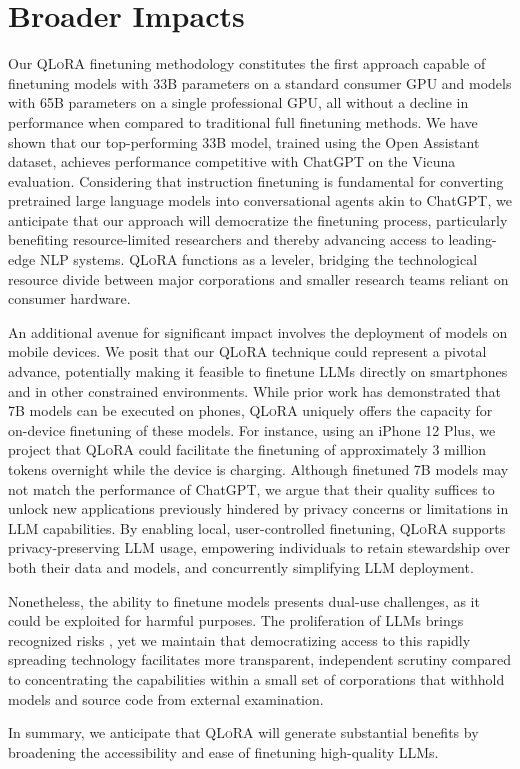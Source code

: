 \section{Broader Impacts}

Our \textsc{QLoRA} finetuning methodology constitutes the first approach capable of finetuning models with 33B parameters on a standard consumer GPU and models with 65B parameters on a single professional GPU, all without a decline in performance when compared to traditional full finetuning methods. We have shown that our top-performing 33B model, trained using the Open Assistant dataset, achieves performance competitive with ChatGPT on the Vicuna evaluation. Considering that instruction finetuning is fundamental for converting pretrained large language models into conversational agents akin to ChatGPT, we anticipate that our approach will democratize the finetuning process, particularly benefiting resource-limited researchers and thereby advancing access to leading-edge NLP systems. \textsc{QLoRA} functions as a leveler, bridging the technological resource divide between major corporations and smaller research teams reliant on consumer hardware.

An additional avenue for significant impact involves the deployment of models on mobile devices. We posit that our \textsc{QLoRA} technique could represent a pivotal advance, potentially making it feasible to finetune LLMs directly on smartphones and in other constrained environments. While prior work has demonstrated that 7B models can be executed on phones, \textsc{QLoRA} uniquely offers the capacity for on-device finetuning of these models. For instance, using an iPhone 12 Plus, we project that \textsc{QLoRA} could facilitate the finetuning of approximately 3 million tokens overnight while the device is charging. Although finetuned 7B models may not match the performance of ChatGPT, we argue that their quality suffices to unlock new applications previously hindered by privacy concerns or limitations in LLM capabilities. By enabling local, user-controlled finetuning, \textsc{QLoRA} supports privacy-preserving LLM usage, empowering individuals to retain stewardship over both their data and models, and concurrently simplifying LLM deployment.

Nonetheless, the ability to finetune models presents dual-use challenges, as it could be exploited for harmful purposes. The proliferation of LLMs brings recognized risks \citep{bommasani2021opportunities,bender2021dangers}, yet we maintain that democratizing access to this rapidly spreading technology facilitates more transparent, independent scrutiny compared to concentrating the capabilities within a small set of corporations that withhold models and source code from external examination.

In summary, we anticipate that \textsc{QLoRA} will generate substantial benefits by broadening the accessibility and ease of finetuning high-quality LLMs.